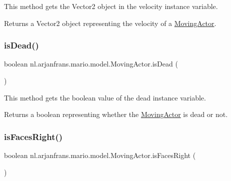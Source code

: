 This method gets the Vector2 object in the velocity instance variable. 

\begin{DoxyReturn}{Returns}
a Vector2 object representing the velocity of a \hyperlink{classnl_1_1arjanfrans_1_1mario_1_1model_1_1MovingActor}{Moving\+Actor}. 
\end{DoxyReturn}
\mbox{\label{classnl_1_1arjanfrans_1_1mario_1_1model_1_1MovingActor_a5a5575f015d9ba97fcf344ae203f893c}} 
\subsubsection{\texorpdfstring{is\+Dead()}{isDead()}}
{\footnotesize\ttfamily boolean nl.\+arjanfrans.\+mario.\+model.\+Moving\+Actor.\+is\+Dead (\begin{DoxyParamCaption}{ }\end{DoxyParamCaption})}



This method gets the boolean value of the dead instance variable. 

\begin{DoxyReturn}{Returns}
a boolean representing whether the \hyperlink{classnl_1_1arjanfrans_1_1mario_1_1model_1_1MovingActor}{Moving\+Actor} is dead or not. 
\end{DoxyReturn}
\mbox{\label{classnl_1_1arjanfrans_1_1mario_1_1model_1_1MovingActor_a4fb6d4e3924b419bf9fb360cf2598672}} 
\subsubsection{\texorpdfstring{is\+Faces\+Right()}{isFacesRight()}}
{\footnotesize\ttfamily boolean nl.\+arjanfrans.\+mario.\+model.\+Moving\+Actor.\+is\+Faces\+Right (\begin{DoxyParamCaption}{ }\end{DoxyParamCaption})}



